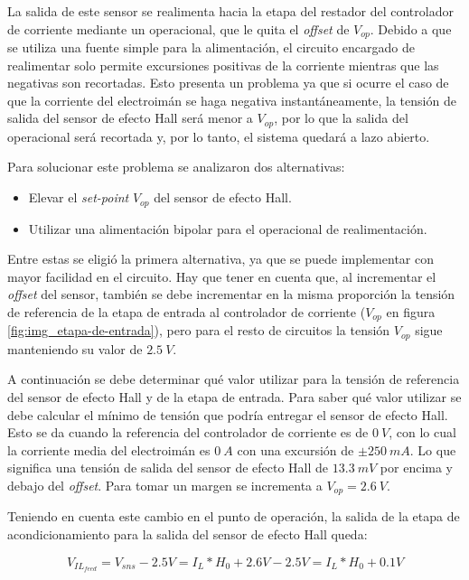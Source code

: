 La salida de este sensor se realimenta hacia la etapa del restador del controlador de corriente mediante un operacional, que le quita el \textsl{offset} de $V_{op}$. Debido a que se utiliza una fuente simple para la alimentación, el circuito encargado de realimentar solo permite excursiones positivas de la corriente mientras que las negativas son recortadas. Esto presenta un problema ya que si ocurre el caso de que la corriente del electroimán se haga negativa instantáneamente, la tensión de salida del sensor de efecto Hall será menor a $V_{op}$, por lo que la salida del operacional será recortada y, por lo tanto, el sistema quedará a lazo abierto.

Para solucionar este problema se analizaron dos alternativas:

\begin{itemize} 
	\item Elevar el \textsl{set-point}  $V_{op}$ del sensor de efecto Hall.
	
	\item Utilizar una alimentación bipolar para el operacional de realimentación.
\end{itemize}

Entre estas se eligió la primera alternativa, ya que se puede implementar con mayor facilidad en el circuito. Hay que tener en cuenta que, al incrementar el \textsl{offset} del sensor, también se debe incrementar en la misma proporción la tensión de referencia de la etapa de entrada al controlador de corriente ($V_{op}$ en figura \ref{fig:img_etapa-de-entrada}), pero para el resto de circuitos la tensión $V_{op}$ sigue manteniendo su valor de $2.5\:V$.

A continuación se debe determinar qué valor utilizar para la tensión de referencia del sensor de efecto Hall y de la etapa de entrada. Para saber qué valor utilizar se debe calcular el mínimo de tensión que podría entregar el sensor de efecto Hall. Esto se da cuando la referencia del controlador de corriente es de $0\:V$, con lo cual la corriente media del electroimán es $0 \:A$ con una excursión de $±250\:mA$. Lo que significa una tensión de salida del sensor de efecto Hall de $13.3\:mV$ por encima y debajo del \textsl{offset}. Para tomar un margen se incrementa a $V_{op}=2.6\:V$. 

Teniendo en cuenta este cambio en el punto de operación, la salida de la etapa de acondicionamiento para la salida del sensor de efecto Hall queda:

\begin{equation} \label{eq_salida_restador_hall_2}
	V_{IL_{feed}}=V_{sns}-2.5V =I_L*H_0 + 2.6V - 2.5V =I_L*H_0+0.1V
\end{equation}

